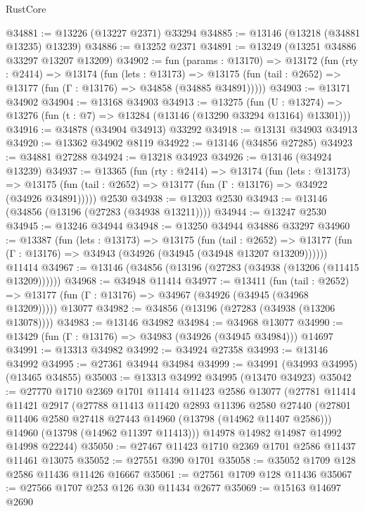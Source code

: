\begin{lexlean}{RustCore}
\begin{coremodule}
@34881 := @13226 (@13227 @2371) @33294
@34885 := @13146 (@13218 (@34881 @13235) @13239)
@34886 := @13252 @2371
@34891 := @13249 (@13251 @34886 @33297 @13207 @13209)
@34902 := fun (params : @13170) =>
  @13172
    (fun (rty : @2414) =>
    @13174
      (fun (lets : @13173) =>
      @13175 (fun (tail : @2652) => @13177 (fun (Γ : @13176) => @34858 (@34885 @34891)))))
@34903 := @13171 @34902
@34904 := @13168 @34903
@34913 := @13275
    (fun (U : @13274) => @13276 (fun (t : @7) => @13284 (@13146 (@13290 @33294 @13164) @13301)))
@34916 := @34878 (@34904 @34913) @33292
@34918 := @13131 @34903 @34913
@34920 := @13362 @34902 @8119
@34922 := @13146 (@34856 @27285)
@34923 := @34881 @27288
@34924 := @13218 @34923
@34926 := @13146 (@34924 @13239)
@34937 := @13365
    (fun (rty : @2414) =>
    @13174
      (fun (lets : @13173) =>
      @13175 (fun (tail : @2652) => @13177 (fun (Γ : @13176) => @34922 (@34926 @34891)))))
    @2530
@34938 := @13203 @2530
@34943 := @13146 (@34856 (@13196 (@27283 (@34938 @13211))))
@34944 := @13247 @2530
@34945 := @13246 @34944
@34948 := @13250 @34944 @34886 @33297
@34960 := @13387
    (fun (lets : @13173) =>
    @13175
      (fun (tail : @2652) =>
      @13177 (fun (Γ : @13176) => @34943 (@34926 (@34945 (@34948 @13207 @13209))))))
    @11414
@34967 := @13146 (@34856 (@13196 (@27283 (@34938 (@13206 (@11415 @13209))))))
@34968 := @34948 @11414
@34977 := @13411
    (fun (tail : @2652) => @13177 (fun (Γ : @13176) => @34967 (@34926 (@34945 (@34968 @13209)))))
    @13077
@34982 := @34856 (@13196 (@27283 (@34938 (@13206 @13078))))
@34983 := @13146 @34982
@34984 := @34968 @13077
@34990 := @13429 (fun (Γ : @13176) => @34983 (@34926 (@34945 @34984))) @14697
@34991 := @13313 @34982
@34992 := @34924 @27358
@34993 := @13146 @34992
@34995 := @27361 @34944 @34984
@34999 := @34991 (@34993 @34995) (@13465 @34855)
@35003 := @13313 @34992 @34995 (@13470 @34923)
@35042 := @27770
    @1710
    @2369
    @1701
    @11414
    @11423
    @2586
    @13077
    (@27781
      @11414
      @11421
      @2917
      (@27788
        @11413
        @11420
        @2893
        @11396
        @2580
        @27440
        (@27801 @11406 @2580 @27418 @27443 @14960 (@13798 (@14962 @11407 @2586)))
        @14960
        (@13798 (@14962 @11397 @11413)))
      @14978
      @14982
      @14987
      @14992
      @14998
      @22244)
@35050 := @27467 @11423 @1710 @2369 @1701 @2586 @11437 @11461 @13075
@35052 := @27551 @390 @1701
@35058 := @35052 @1709 @128 @2586 @11436 @11426 @16667
@35061 := @27561 @1709 @128 @11436
@35067 := @27566 @1707 @253 @126 @30 @11434 @2677
@35069 := @15163 @14697 @2690

\end{coremodule}
\end{lexlean}
